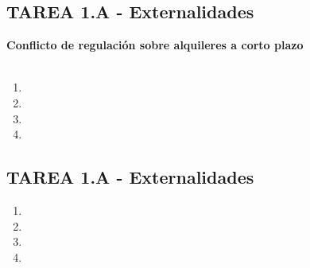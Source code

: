 \subsection*{\center TAREA 1.A - Externalidades}
\vspace{1cm}
\textbf{Conflicto de regulación sobre alquileres a corto plazo}\\\\

\begin{enumerate}

    \item 

    \item

    \item 

    \item 

\end{enumerate}
\newpage



\subsection*{\center TAREA 1.A - Externalidades}
\vspace{1cm}

\begin{enumerate}

    \item 

    \item

    \item

    \item	

\end{enumerate}
